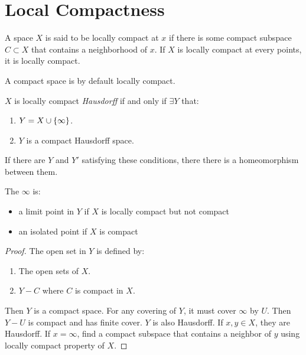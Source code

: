 \section{Local Compactness}

\begin{definition}
    A space $X$ is said to be locally compact at $x$ if there is some compact subspace $C \subset X$ that contains a neighborhood of $x$. If $X$ is locally compact at every points, it is locally compact.
    
    A compact space is by default locally compact.
\end{definition}


\begin{theorem}
    $X$ is locally compact \emph{Hausdorff} if and only if $\exists Y$ that:
    \begin{enumerate}
        \item $Y = X \cup \set{\infty}$.
        \item $Y$ is a compact Hausdorff space.
    \end{enumerate}
    
    If there are $Y$ and $Y'$ satisfying these conditions, there there is a homeomorphism between them. 
    
    
    The $\infty$ is:
    \begin{itemize}
        \item a limit point in $Y$ if $X$ is locally compact but not compact
        \item an isolated point if $X$ is compact
    \end{itemize}
    
     
\end{theorem}
\begin{proof}
    The open set in $Y$ is defined by:
    \begin{enumerate}
        \item The open sets of $X$.
        \item $Y -C$ where $C$ is compact in $X$.
    \end{enumerate}
    
    Then $Y$ is a compact space. For any covering of $Y$, it must cover $\infty$ by $U$. Then $Y-U$ is compact and has finite cover. $Y$ is also Hausdorff. If $x,y \in X$, they are Hausdorff. If $x =\infty$, find a compact subspace that contains a neighbor of $y$ using locally compact property of $X$.
\end{proof}

